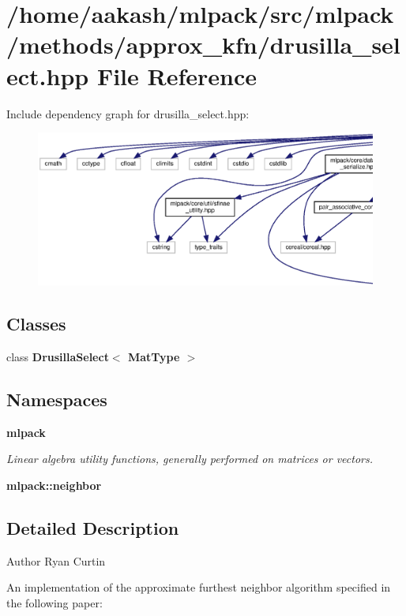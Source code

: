 \section{/home/aakash/mlpack/src/mlpack/methods/approx\+\_\+kfn/drusilla\+\_\+select.hpp File Reference}
\label{drusilla__select_8hpp}
Include dependency graph for drusilla\+\_\+select.\+hpp\+:
\nopagebreak
\begin{figure}[H]
\begin{center}
\leavevmode
\includegraphics[width=350pt]{drusilla__select_8hpp__incl}
\end{center}
\end{figure}
\subsection*{Classes}
\begin{DoxyCompactItemize}
\item 
class \textbf{ Drusilla\+Select$<$ Mat\+Type $>$}
\end{DoxyCompactItemize}
\subsection*{Namespaces}
\begin{DoxyCompactItemize}
\item 
 \textbf{ mlpack}
\begin{DoxyCompactList}\small\item\em Linear algebra utility functions, generally performed on matrices or vectors. \end{DoxyCompactList}\item 
 \textbf{ mlpack\+::neighbor}
\end{DoxyCompactItemize}


\subsection{Detailed Description}
\begin{DoxyAuthor}{Author}
Ryan Curtin
\end{DoxyAuthor}
An implementation of the approximate furthest neighbor algorithm specified in the following paper\+:



